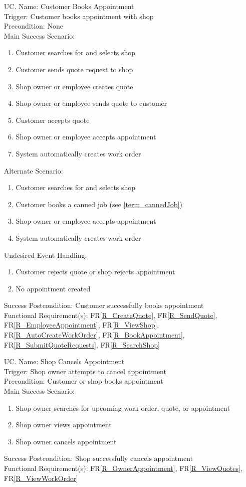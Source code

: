 \documentclass[12pt]{article}
\newcounter{ucnum} %
\begin{document}
\begin{itemize}
\item[UC\refstepcounter{ucnum}\theucnum \label{UC_CustomerBooksAppointment}. ]
Name: Customer Books Appointment\\
Trigger: Customer books appointment with shop\\
Precondition: None\\
Main Success Scenario:
\begin{enumerate}
    \item Customer searches for and selects shop
    \item Customer sends quote request to shop
    \item Shop owner or employee creates quote
    \item Shop owner or employee sends quote to customer
    \item Customer accepts quote
    \item Shop owner or employee accepts appointment
    \item System automatically creates work order
\end{enumerate}
Alternate Scenario:
\begin{enumerate}
    \item Customer searches for and selects shop
    \item Customer books a canned job (see \ref{term_cannedJob})
    \item Shop owner or employee accepts appointment
    \item System automatically creates work order
\end{enumerate}
Undesired Event Handling:
\begin{enumerate}
    \item Customer rejects quote or shop rejects appointment
    \item No appointment created
\end{enumerate}
Success Postcondition: Customer successfully books appointment\\
Functional Requirement(s): FR\ref{R_CreateQuote}, FR\ref{R_SendQuote}, FR\ref{R_EmployeeAppointment}, FR\ref{R_ViewShop}, FR\ref{R_AutoCreateWorkOrder}, FR\ref{R_BookAppointment}, FR\ref{R_SubmitQuoteRequests}, FR\ref{R_SearchShop}

\item[UC\refstepcounter{ucnum}\theucnum \label{UC_CancelAppointment}. ]
Name: Shop Cancels Appointment\\
Trigger: Shop owner attempts to cancel appointment\\
Precondition: Customer or shop books appointment\\
Main Success Scenario:
\begin{enumerate}
    \item Shop owner searches for upcoming work order, quote, or appointment
    \item Shop owner views appointment
    \item Shop owner cancels appointment
\end{enumerate}
Success Postcondition: Shop successfully cancels appointment\\
Functional Requirement(s): FR\ref{R_OwnerAppointment}, FR\ref{R_ViewQuotes}, FR\ref{R_ViewWorkOrder}


\end{itemize}
\end{document}
